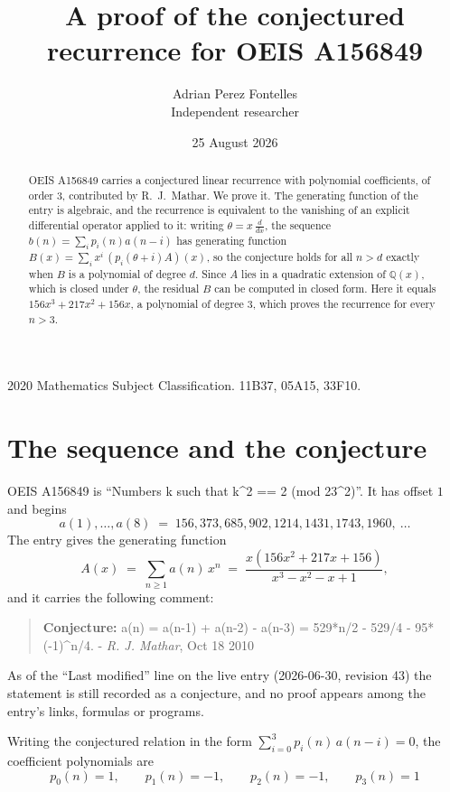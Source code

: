 \documentclass[11pt,a4paper]{article}
\title{A proof of the conjectured recurrence for OEIS A156849}
\author{Adrian Perez Fontelles\\ \small Independent researcher}
\date{25 August 2026}
\theoremstyle{plain}
\theoremstyle{definition}
\begin{document}
\maketitle

\begin{abstract}
OEIS A156849 carries a conjectured linear recurrence with polynomial coefficients, of
order 3, contributed by R.~J.~Mathar. We prove it. The generating function of the
entry is algebraic, and the recurrence is equivalent to the vanishing of an explicit
differential operator applied to it: writing $\theta=x\,\frac{d}{dx}$, the sequence
$b(n)=\sum_{i}p_{i}(n)a(n-i)$ has generating function
$B(x)=\sum_{i}x^{i}\,(p_{i}(\theta+i)A)(x)$, so the conjecture holds for all $n>d$ exactly
when $B$ is a polynomial of degree $d$. Since $A$ lies in a quadratic extension of
$\mathbb{Q}(x)$, which is closed under $\theta$, the residual $B$ can be computed in
closed form. Here it equals $156 x^{3} + 217 x^{2} + 156 x$, a polynomial of degree $3$, which proves
the recurrence for every $n>3$.
\end{abstract}

\noindent\small 2020 Mathematics Subject Classification. 11B37, 05A15, 33F10.\normalsize

\section{The sequence and the conjecture}

OEIS A156849 is ``Numbers k such that k\^{}2 == 2 (mod 23\^{}2)''. It has offset $1$ and begins
\[
a(1),\dots,a(8)\;=\;156, 373, 685, 902, 1214, 1431, 1743, 1960,\ \dots
\]
The entry gives the generating function
\begin{equation}\label{eq:gf}
A(x)\;=\;\sum_{n\ge 1} a(n)\,x^{n}\;=\;\frac{x \left(156 x^{2} + 217 x + 156\right)}{x^{3} - x^{2} - x + 1} ,
\end{equation}
and it carries the following comment:
\begin{quote}\small
\textbf{Conjecture:} a(n) = a(n-1) + a(n-2) - a(n-3) = 529*n/2 - 529/4 - 95*(-1)\^{}n/4. - \emph{R. J. Mathar}, Oct 18 2010
\end{quote}
As of the ``Last modified'' line on the live entry (2026-06-30, revision 43) the
statement is still recorded as a conjecture, and no proof appears among the entry's links,
formulas or programs.

Writing the conjectured relation in the form $\sum_{i=0}^{3}p_{i}(n)\,a(n-i)=0$,
the coefficient polynomials are
\[
p_{0}(n)=1,\qquad p_{1}(n)=-1,\qquad p_{2}(n)=-1,\qquad p_{3}(n)=1
\]
\end{document}
